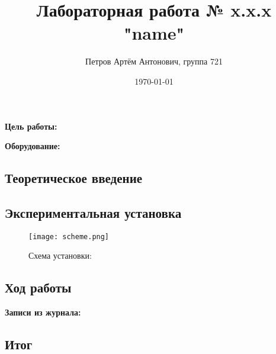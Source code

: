 \documentclass[a4paper,12pt]{article}
\author{Петров Артём Антонович, группа 721}
\title{Лабораторная работа № x.x.x "name"}
\date{\today}
\begin{document}

\begin{minipage}[t][5cm]{\textwidth}
\maketitle
\end{minipage}


\textbf{Цель работы:} 
\bigskip

\medskip
\textbf{Оборудование:} 
\bigskip

\subsection*{Теоретическое введение}
\bigskip


\bigskip

\subsection*{Экспериментальная установка}
\bigskip


\begin{figure}[ht]
\centering
\texttt{[image: scheme.png]}
\caption{Схема установки: }\label{schema}
\end{figure}

\bigskip

\subsection*{Ход работы}
\bigskip


\bigskip

\textbf{Записи из журнала:}
\bigskip


\bigskip

\subsection*{Итог}
\bigskip
 
\end{document}
